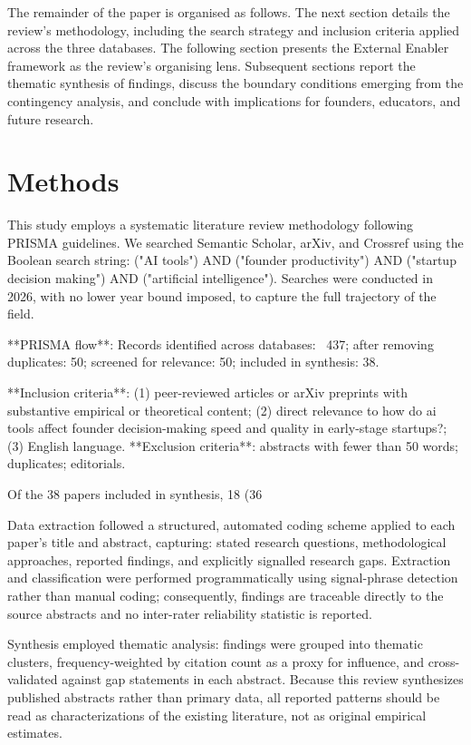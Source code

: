 \documentclass[11pt, a4paper]{article}
\begin{document}
The remainder of the paper is organised as follows. The next section details the review's methodology, including the search strategy and inclusion criteria applied across the three databases. The following section presents the External Enabler framework as the review's organising lens. Subsequent sections report the thematic synthesis of findings, discuss the boundary conditions emerging from the contingency analysis, and conclude with implications for founders, educators, and future research.

\section{Methods}
This study employs a systematic literature review methodology following PRISMA guidelines. We searched Semantic Scholar, arXiv, and Crossref using the Boolean search string: ("AI tools") AND ("founder productivity") AND ("startup decision making") AND ("artificial intelligence"). Searches were conducted in 2026, with no lower year bound imposed, to capture the full trajectory of the field.

**PRISMA flow**: Records identified across databases: ~437; after removing duplicates: 50; screened for relevance: 50; included in synthesis: 38.

**Inclusion criteria**: (1) peer-reviewed articles or arXiv preprints with substantive empirical or theoretical content; (2) direct relevance to how do ai tools affect founder decision-making speed and quality in early-stage startups?; (3) English language. **Exclusion criteria**: abstracts with fewer than 50 words; duplicates; editorials.

Of the 38 papers included in synthesis, 18 (36%

Data extraction followed a structured, automated coding scheme applied to each paper's title and abstract, capturing: stated research questions, methodological approaches, reported findings, and explicitly signalled research gaps. Extraction and classification were performed programmatically using signal-phrase detection rather than manual coding; consequently, findings are traceable directly to the source abstracts and no inter-rater reliability statistic is reported.

Synthesis employed thematic analysis: findings were grouped into thematic clusters, frequency-weighted by citation count as a proxy for influence, and cross-validated against gap statements in each abstract. Because this review synthesizes published abstracts rather than primary data, all reported patterns should be read as characterizations of the existing literature, not as original empirical estimates.
\end{document}
